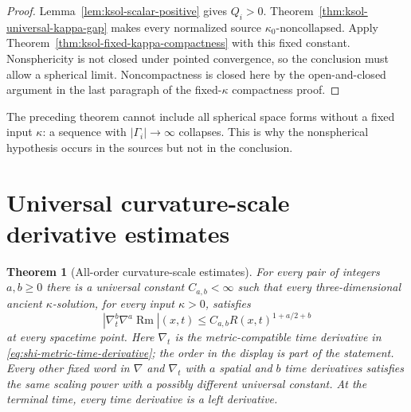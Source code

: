 \documentclass[10pt]{coll-l}
\newtheorem{theorem}{Theorem}[chapter]
\theoremstyle{definition}
\theoremstyle{remark}
\numberwithin{section}{chapter}
\numberwithin{equation}{chapter}
\newcommand{\Rm}{\operatorname{Rm}}
\begin{document}
\begin{proof}
Lemma~\ref{lem:ksol-scalar-positive} gives $Q_i>0$.
Theorem~\ref{thm:ksol-universal-kappa-gap} makes every normalized source
$\kappa_0$-noncollapsed.  Apply
Theorem~\ref{thm:ksol-fixed-kappa-compactness} with this fixed constant.
Nonsphericity is not closed under pointed convergence, so the conclusion
must allow a spherical limit.  Noncompactness is closed here by the
open-and-closed argument in the last paragraph of the fixed-$\kappa$
compactness proof.
\end{proof}

The preceding theorem cannot include all spherical space forms without a
fixed input $\kappa$: a sequence with $|\Gamma_i|\to\infty$ collapses.  This
is why the nonspherical hypothesis occurs in the sources but not in the
conclusion.

\section{Universal curvature-scale derivative estimates}
\label{sec:ksol-universal-derivatives}

\begin{theorem}[All-order curvature-scale estimates]
\label{thm:ksol-universal-derivative-estimates}
For every pair of integers $a,b\geq0$ there is a universal constant
$C_{a,b}<\infty$ such that every three-dimensional ancient
$\kappa$-solution, for every input $\kappa>0$, satisfies
\begin{equation}
 \left|\nabla_t^b\nabla^a\Rm\right|(x,t)
       \leq C_{a,b}R(x,t)^{1+a/2+b}                   \label{eq:ksol-universal-mixed-derivatives}
\end{equation}
at every spacetime point.  Here $\nabla_t$ is the metric-compatible time
derivative in \eqref{eq:shi-metric-time-derivative}; the order in the
display is part of the statement.  Every other fixed word in $\nabla$ and
$\nabla_t$ with
$a$ spatial and $b$ time derivatives satisfies the same scaling power with
a possibly different universal constant.  At the terminal time, every
time derivative is a left derivative.
\end{theorem}
\end{document}
